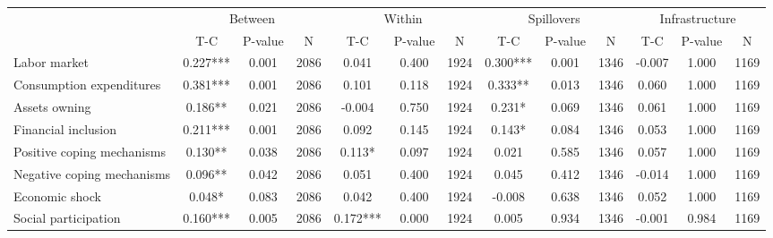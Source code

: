 
\begin{tabular}{l*{12}{c}}\hline&\multicolumn{3}{c}{Between}&\multicolumn{3}{c}{Within}&\multicolumn{3}{c}{Spillovers}&\multicolumn{3}{c}{Infrastructure} \\ \cmidrule(r){2-4}\cmidrule(l){5-7}\cmidrule(l){8-10}\cmidrule(l){9-13} & {T-C} & {P-value} & {N} & {T-C} & {P-value} & {N}  & {T-C} & {P-value} & {N} & {T-C} & {P-value} & {N} \\ \midrule

 Labor market &        0.227*** &        0.001 & 2086    &        0.041 &        0.400 & 1924    &        0.300*** &        0.001 & 1346 &       -0.007 &        1.000 & 1169 \\ 

 Consumption expenditures &        0.381*** &        0.001 & 2086    &        0.101 &        0.118 & 1924    &        0.333** &        0.013 & 1346 &        0.060 &        1.000 & 1169 \\ 

 Assets owning &        0.186** &        0.021 & 2086    &       -0.004 &        0.750 & 1924    &        0.231* &        0.069 & 1346 &        0.061 &        1.000 & 1169 \\ 

 Financial inclusion &        0.211*** &        0.001 & 2086    &        0.092 &        0.145 & 1924    &        0.143* &        0.084 & 1346 &        0.053 &        1.000 & 1169 \\ 

 Positive coping mechanisms &        0.130** &        0.038 & 2086    &        0.113* &        0.097 & 1924    &        0.021 &        0.585 & 1346 &        0.057 &        1.000 & 1169 \\ 

 Negative coping mechanisms &        0.096** &        0.042 & 2086    &        0.051 &        0.400 & 1924    &        0.045 &        0.412 & 1346 &       -0.014 &        1.000 & 1169 \\ 

 Economic shock &        0.048* &        0.083 & 2086    &        0.042 &        0.400 & 1924    &       -0.008 &        0.638 & 1346 &        0.052 &        1.000 & 1169 \\ 

 Social participation &        0.160*** &        0.005 & 2086    &        0.172*** &        0.000 & 1924    &        0.005 &        0.934 & 1346 &       -0.001 &        0.984 & 1169 \\ 


\end{tabular}

